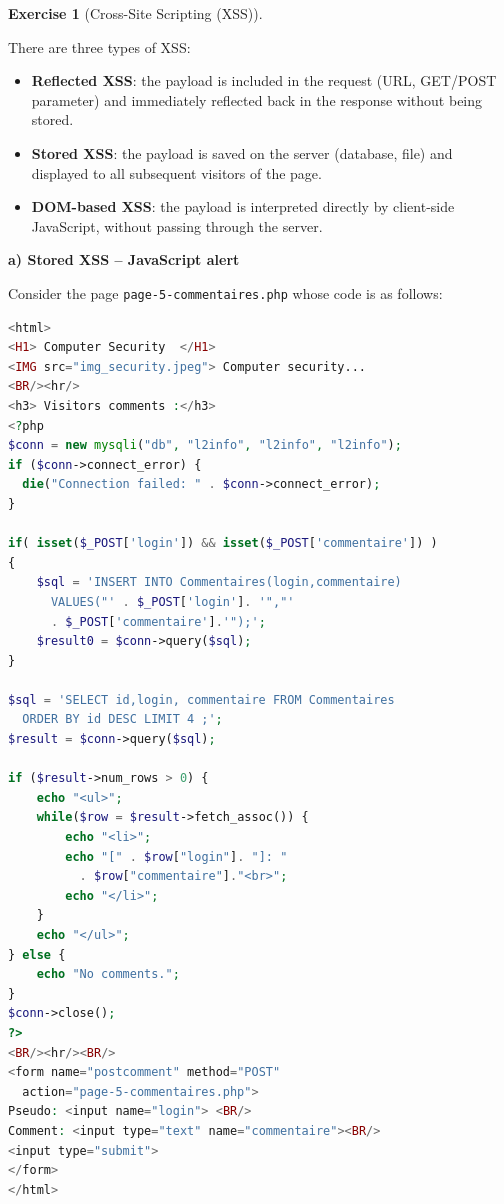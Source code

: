 \documentclass[a4paper,11pt]{article}
\theoremstyle{plain}
\theoremstyle{definition}
\newtheorem{exercice}{Exercise}
\begin{document}

\begin{exercice}[Cross-Site Scripting (XSS)]

\begin{rappel}
There are three types of XSS:
\begin{itemize}
    \item \textbf{Reflected XSS}: the payload is included in the request (URL, GET/POST parameter) and immediately reflected back in the response without being stored.
    \item \textbf{Stored XSS}: the payload is saved on the server (database, file) and displayed to all subsequent visitors of the page.
    \item \textbf{DOM-based XSS}: the payload is interpreted directly by client-side JavaScript, without passing through the server.
\end{itemize}
\end{rappel}

\medskip

\textbf{a) Stored XSS -- JavaScript alert}

\medskip

Consider the page \texttt{page-5-commentaires.php} whose code is as follows:

\begin{lstlisting}[language=PHP]
<html>
<H1> Computer Security  </H1>
<IMG src="img_security.jpeg"> Computer security...
<BR/><hr/>
<h3> Visitors comments :</h3>
<?php
$conn = new mysqli("db", "l2info", "l2info", "l2info");
if ($conn->connect_error) {
  die("Connection failed: " . $conn->connect_error);
}

if( isset($_POST['login']) && isset($_POST['commentaire']) )
{
    $sql = 'INSERT INTO Commentaires(login,commentaire)
      VALUES("' . $_POST['login']. '","'
      . $_POST['commentaire'].'");';
    $result0 = $conn->query($sql);
}

$sql = 'SELECT id,login, commentaire FROM Commentaires
  ORDER BY id DESC LIMIT 4 ;';
$result = $conn->query($sql);

if ($result->num_rows > 0) {
    echo "<ul>";
    while($row = $result->fetch_assoc()) {
        echo "<li>";
        echo "[" . $row["login"]. "]: "
          . $row["commentaire"]."<br>";
        echo "</li>";
    }
    echo "</ul>";
} else {
    echo "No comments.";
}
$conn->close();
?>
<BR/><hr/><BR/>
<form name="postcomment" method="POST"
  action="page-5-commentaires.php">
Pseudo: <input name="login"> <BR/>
Comment: <input type="text" name="commentaire"><BR/>
<input type="submit">
</form>
</html>
\end{lstlisting}


\end{exercice}
\end{document}
